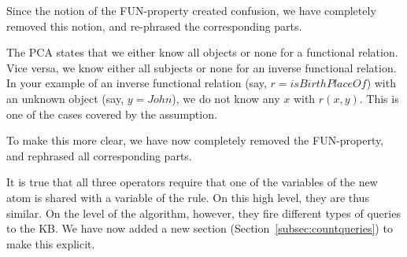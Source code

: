      Since the notion of the FUN-property created confusion, we have completely removed this notion, and re-phrased the corresponding parts.



The PCA states that we either know all objects or none for a functional relation. Vice versa, we know either all subjects or none for an inverse functional relation. In your example of an inverse functional relation (say, $r=isBirthPlaceOf$) with an unknown object (say, $y=John$), we do not know any $x$ with $r(x,y)$. This is one of the cases covered by the assumption.

To make this more clear, we have now completely removed the FUN-property, and rephrased all corresponding parts.



It is true that all three operators require that one of the variables of the new atom is shared with a variable of the rule. On this high level, they are thus similar. On the level of the algorithm, however, they fire different types of queries to the KB. We have now added a new section (Section~\ref{subsec:countqueries}) to make this explicit.


